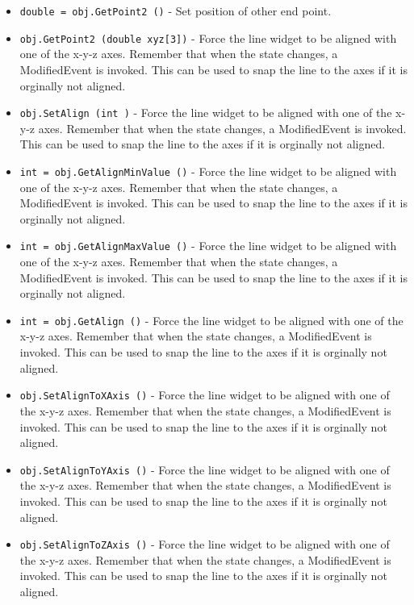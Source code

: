 \begin{itemize}
\item  \verb|double = obj.GetPoint2 ()| -  Set position of other end point.

\item  \verb|obj.GetPoint2 (double xyz[3])| -  Force the line widget to be aligned with one of the x-y-z axes.
 Remember that when the state changes, a ModifiedEvent is invoked.
 This can be used to snap the line to the axes if it is orginally
 not aligned.

\item  \verb|obj.SetAlign (int )| -  Force the line widget to be aligned with one of the x-y-z axes.
 Remember that when the state changes, a ModifiedEvent is invoked.
 This can be used to snap the line to the axes if it is orginally
 not aligned.

\item  \verb|int = obj.GetAlignMinValue ()| -  Force the line widget to be aligned with one of the x-y-z axes.
 Remember that when the state changes, a ModifiedEvent is invoked.
 This can be used to snap the line to the axes if it is orginally
 not aligned.

\item  \verb|int = obj.GetAlignMaxValue ()| -  Force the line widget to be aligned with one of the x-y-z axes.
 Remember that when the state changes, a ModifiedEvent is invoked.
 This can be used to snap the line to the axes if it is orginally
 not aligned.

\item  \verb|int = obj.GetAlign ()| -  Force the line widget to be aligned with one of the x-y-z axes.
 Remember that when the state changes, a ModifiedEvent is invoked.
 This can be used to snap the line to the axes if it is orginally
 not aligned.

\item  \verb|obj.SetAlignToXAxis ()| -  Force the line widget to be aligned with one of the x-y-z axes.
 Remember that when the state changes, a ModifiedEvent is invoked.
 This can be used to snap the line to the axes if it is orginally
 not aligned.

\item  \verb|obj.SetAlignToYAxis ()| -  Force the line widget to be aligned with one of the x-y-z axes.
 Remember that when the state changes, a ModifiedEvent is invoked.
 This can be used to snap the line to the axes if it is orginally
 not aligned.

\item  \verb|obj.SetAlignToZAxis ()| -  Force the line widget to be aligned with one of the x-y-z axes.
 Remember that when the state changes, a ModifiedEvent is invoked.
 This can be used to snap the line to the axes if it is orginally
 not aligned.


\end{itemize}
